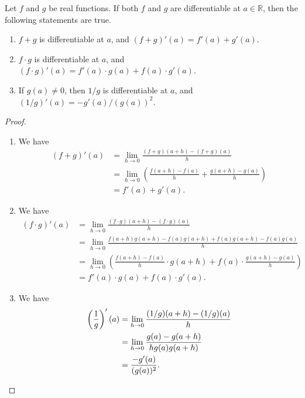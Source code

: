 \begin{theorem}
  Let $f$ and $g$ be real functions.
  If both $f$ and $g$ are differentiable at $a \in \mathbb{R}$, then the
  following statements are true.
  \begin{enumerate}
    \item $f + g$ is differentiable at $a$, and $(f + g)'(a) = f'(a) + g'(a)$.
    \item $f \cdot g$ is differentiable at $a$, and
    $(f \cdot g)'(a) = f'(a) \cdot g(a) + f(a) \cdot g'(a)$.
    \item If $g(a) \neq 0$, then $1 /g$ is differentiable at $a$, and
    $(1 / g)'(a) = -g'(a) / (g(a))^2$.
  \end{enumerate}
\end{theorem}
\begin{proof}
  \leavevmode
  \begin{enumerate}
    \item We have
    \begin{align*}
      (f + g)'(a)
      &= \lim_{h \to 0} \frac{(f + g)(a + h) - (f + g)(a)}{h} \\
      &= \lim_{h \to 0} \left(\frac{f(a + h) - f(a)}{h}
      + \frac{g(a + h) - g(a)}{h}\right) \\[.3em]
      &= f'(a) + g'(a).
    \end{align*}
    \item We have
    \begin{align*}
      (f \cdot g)'(a)
      &= \lim_{h \to 0} \frac{(f \cdot g)(a + h) - (f \cdot g)(a)}{h} \\
      &= \lim_{h \to 0} \frac{f(a + h)g(a + h) - f(a)g(a + h) + f(a)g(a + h)
      - f(a)g(a)}{h} \\
      &= \lim_{h \to 0} \left(\frac{f(a + h) - f(a)}{h} \cdot g(a + h)
      + f(a) \cdot \frac{g(a + h) - g(a)}{h}\right) \\[.3em]
      &= f'(a) \cdot g(a) + f(a) \cdot g'(a).
    \end{align*}
    \item We have
    \begin{align*}
      \left(\frac{1}{g}\right)'(a)
      &= \lim_{h \to 0} \frac{(1/g)(a + h) - (1/g)(a)}{h} \\
      &= \lim_{h \to 0} \frac{g(a) - g(a + h)}{hg(a)g(a + h)} \\
      &= \frac{-g'(a)}{(g(a))^2}.
      \qedhere
    \end{align*}
  \end{enumerate}
\end{proof}


